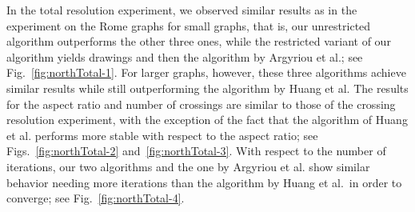 \documentclass[runningheads]{llncs}
\begin{document}
In the total resolution experiment, we observed similar results as in the experiment on the Rome graphs for small graphs, that is, our unrestricted algorithm outperforms the other three ones, while the restricted variant of our algorithm yields drawings and then the algorithm by Argyriou et al.; see Fig.~\ref{fig:northTotal-1}. For larger graphs, however, these three algorithms achieve similar results while still outperforming the algorithm by Huang et al. The results for the aspect ratio and number of crossings are similar to those of the crossing resolution experiment, with the exception of the fact that the algorithm of Huang et al. performs more stable with respect to the aspect ratio; see Figs.~\ref{fig:northTotal-2} and~\ref{fig:northTotal-3}. With respect to the number of iterations, our two algorithms and the one by Argyriou et al. show similar behavior needing more iterations than the algorithm by Huang et al.\ in order to converge; see Fig.~\ref{fig:northTotal-4}. %
\end{document}
